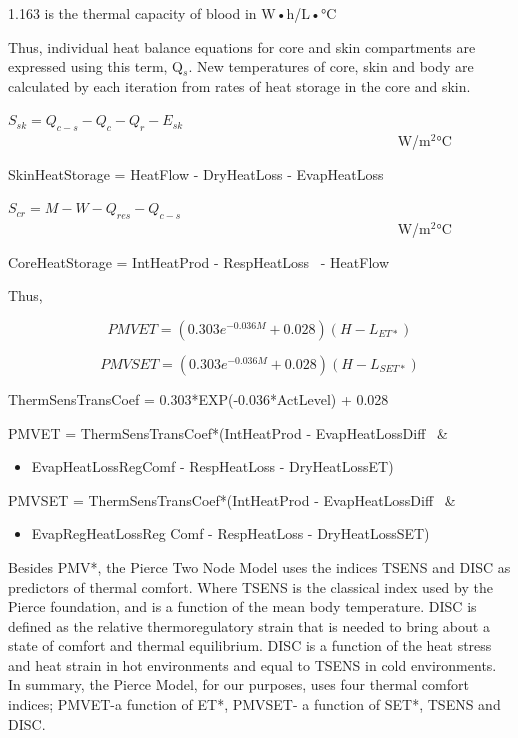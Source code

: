 1.163 is the thermal capacity of blood in W•h/L•°C

Thus, individual heat balance equations for core and skin compartments are expressed using this term, Q\(_{s}\). New temperatures of core, skin and body are calculated by each iteration from rates of heat storage in the core and skin.

\({S_{sk}} = {Q_{c - s}} - {Q_c} - {Q_r} - {E_{sk}}\) ~~~~~~~~~~~~~~~~~~~~~~~~~~~~~~~~~~~~~~~~~~~~~~~~~~~~~~~ W/m\(^{2}\)°C

SkinHeatStorage = HeatFlow - DryHeatLoss - EvapHeatLoss

\({S_{cr}} = M - W - {Q_{res}} - {Q_{c - s}}\) ~~~~~~~~~~~~~~~~~~~~~~~~~~~~~~~~~~~~~~~~~~~~~~~~~~~~~~~ W/m\(^{2}\)°C

CoreHeatStorage = IntHeatProd - RespHeatLoss~ - HeatFlow

Thus,

\begin{equation}
PMVET = (0.303{e^{ - 0.036M}} + 0.028)(H - {L_{ET*}})
\end{equation}

\begin{equation}
PMVSET = (0.303{e^{ - 0.036M}} + 0.028)(H - {L_{SET*}})
\end{equation}

ThermSensTransCoef = 0.303*EXP(-0.036*ActLevel) + 0.028

PMVET = ThermSensTransCoef*(IntHeatProd - EvapHeatLossDiff~ \&

\begin{itemize}
\tightlist
\item
  EvapHeatLossRegComf - RespHeatLoss - DryHeatLossET)
\end{itemize}

PMVSET = ThermSensTransCoef*(IntHeatProd - EvapHeatLossDiff~ \&

\begin{itemize}
\tightlist
\item
  EvapRegHeatLossReg Comf - RespHeatLoss - DryHeatLossSET)
\end{itemize}

Besides PMV*, the Pierce Two Node Model uses the indices TSENS and DISC as predictors of thermal comfort. Where TSENS is the classical index used by the Pierce foundation, and is a function of the mean body temperature. DISC is defined as the relative thermoregulatory strain that is needed to bring about a state of comfort and thermal equilibrium. DISC is a function of the heat stress and heat strain in hot environments and equal to TSENS in cold environments. In summary, the Pierce Model, for our purposes, uses four thermal comfort indices; PMVET-a function of ET*, PMVSET- a function of SET*, TSENS and DISC.

